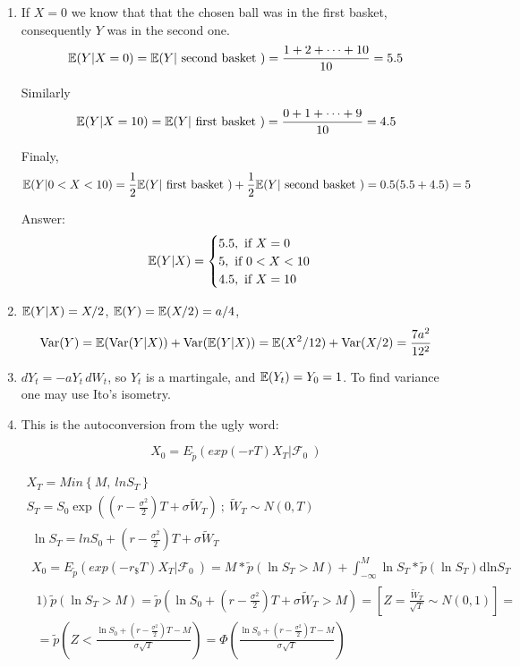 \documentclass[12pt, a4paper]{article}
\newcommand{\cF}{\mathcal{F}}
\begin{document}
\begin{enumerate}
\item If $X=0$ we know that that the chosen ball was in the first basket, consequently $Y$ was in the second one.
\[
\mathbb{E}(Y|X=0) = \mathbb{E}(Y| \text{ second basket } )=\frac{1+2+\dots+10}{10}=5.5
\]

Similarly
\[
\mathbb{E}(Y|X=10) = \mathbb{E}(Y|\text{ first basket } )=\frac{0+1+\dots+9}{10}=4.5
\]

Finaly,
\[
\mathbb{E}(Y|0<X<10) = \frac{1}{2}\mathbb{E}(Y|\text{ first basket }) +\frac{1}{2}\mathbb{E}(Y|\text{ second basket })=0.5(5.5+4.5)=5
\]

Answer:
\[
\mathbb{E}(Y|X) =
 \begin{cases}
   5.5, \text{ if } X=0\\
  5, \text{ if } 0<X<10\\
 4.5, \text{ if }  X=10\\
   \end{cases}
\]

\item $\mathbb{E}(Y|X)=X/2$, $\mathbb{E}(Y)=\mathbb{E}(X/2)=a/4$,
\[
\operatorname{Var}(Y)=\mathbb{E}(\operatorname{Var}(Y|X))+\operatorname{Var}(\mathbb{E}(Y|X))=\mathbb{E}(X^2/12)+\operatorname{Var}(X/2)=\frac{7a^2}{12^2}
\]
\item $dY_t=-a Y_t \, dW_t$, so $Y_t$ is a martingale, and $\mathbb{E}(Y_t)=Y_0=1$. To find variance one may use Ito's isometry.


\item This is the autoconversion from the ugly word:

\[X_{0} = E_{\tilde{p}}\left( exp\left( - rT \right)X_{T}\left| \cF_{0} \right.\  \right)\]

\[\begin{matrix}
X_{T} = Min\left\{ M,\ lnS_{T} \right\} \\
S_{T} = S_{0}\exp\left( \left( r - \frac{\sigma^{2}}{2} \right)T + \sigma{\tilde{W}}_{T} \right)\ ;\ {\tilde{W}}_{T}\sim N\left( 0,T \right) \\
\begin{matrix}
\ln S_{T} = lnS_{0} + \left( r - \frac{\sigma^{2}}{2} \right)T + \sigma{\tilde{W}}_{T} \\
X_{0} = E_{\tilde{p}}\left( exp\left( - r_{\$}T \right)X_{T}\left| \cF_{0} \right.\  \right) = M*\tilde{p}\left( \ln S_{T} > M \right) + \int_{- \infty}^{M}{\ln S_{T}*\tilde{p}\left( \ln S_{T} \right)\text{dln}S_{T}} \\
\begin{matrix}
1)\ \tilde{p}\left( \ln S_{T} > M \right) = \tilde{p}\left( \ln S_{0} + \left( r - \frac{\sigma^{2}}{2} \right)T + \sigma{\tilde{W}}_{T} > M \right) = \left\lbrack Z = \frac{{\tilde{W}}_{T}}{\sqrt{T}}\sim N(0,1) \right\rbrack = \\
 = \tilde{p}\left( Z < \frac{\ln S_{0} + \left( r - \frac{\sigma^{2}}{2} \right)T - M}{\sigma\sqrt{T}} \right) = \Phi\left( \frac{\ln S_{0} + \left( r - \frac{\sigma^{2}}{2} \right)T - M}{\sigma\sqrt{T}} \right) \\
\end{matrix} \\
\end{matrix} \\
\end{matrix}\]


\end{enumerate}
\end{document}
